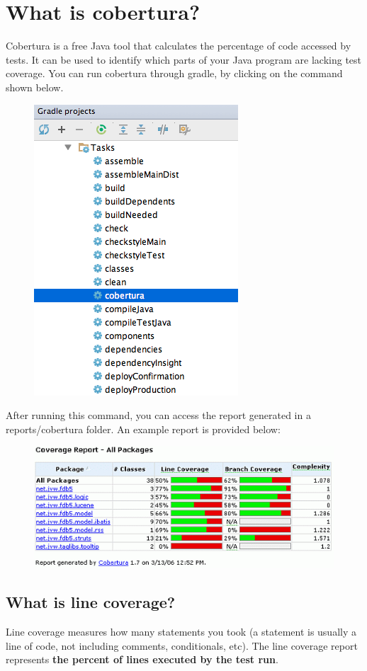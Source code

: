\documentclass[oneside]{book}
\begin{document}
\section{What is cobertura?}
Cobertura is a free Java tool that calculates the percentage of code accessed by tests. It can be used to identify which parts of your Java program are lacking test coverage. You can run cobertura through gradle, by clicking on the command shown below.\par
\begin{figure}[h!]
\centering
	\includegraphics[scale=0.4]{cobertura.png}
\end{figure}
After running this command, you can access the report generated in a reports/cobertura folder. An example report is provided below:
\begin{figure}[h!]
\centering
	\includegraphics[scale=0.6]{coberturareport.png}
\end{figure}
\subsection{What is line coverage?}
Line coverage measures how many statements you took (a statement is usually a line of code, not including comments, conditionals, etc). The line coverage report represents \textbf{the percent of lines executed by the test run}.
\end{document}
